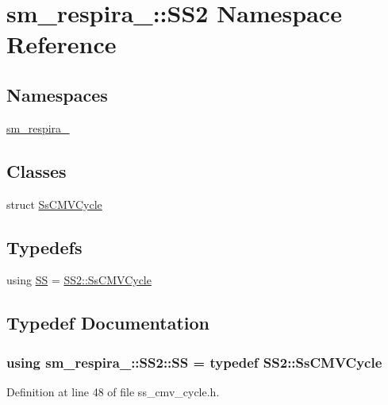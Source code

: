 \hypertarget{namespacesm__respira__1_1_1SS2}{}\section{sm\+\_\+respira\+\_\+:\+:S\+S2 Namespace Reference}
\label{namespacesm__respira__1_1_1SS2}
\subsection*{Namespaces}
\begin{DoxyCompactItemize}
\item 
 \hyperlink{namespacesm__respira__1_1_1SS2_1_1sm__respira__1}{sm\+\_\+respira\+\_}
\end{DoxyCompactItemize}
\subsection*{Classes}
\begin{DoxyCompactItemize}
\item 
struct \hyperlink{structsm__respira__1_1_1SS2_1_1SsCMVCycle}{Ss\+C\+M\+V\+Cycle}
\end{DoxyCompactItemize}
\subsection*{Typedefs}
\begin{DoxyCompactItemize}
\item 
using \hyperlink{namespacesm__respira__1_1_1SS2_a7fd0a7d8be6548b814d37263b7508763}{SS} = \hyperlink{structsm__respira__1_1_1SS2_1_1SsCMVCycle}{S\+S2\+::\+Ss\+C\+M\+V\+Cycle}
\end{DoxyCompactItemize}


\subsection{Typedef Documentation}
\subsubsection[{\texorpdfstring{SS}{SS}}]{\setlength{\rightskip}{0pt plus 5cm}using {\bf sm\+\_\+respira\+\_\+::\+S\+S2\+::\+SS} = typedef {\bf S\+S2\+::\+Ss\+C\+M\+V\+Cycle}}\hypertarget{namespacesm__respira__1_1_1SS2_a7fd0a7d8be6548b814d37263b7508763}{}\label{namespacesm__respira__1_1_1SS2_a7fd0a7d8be6548b814d37263b7508763}


Definition at line 48 of file ss\+\_\+cmv\+\_\+cycle.\+h.

